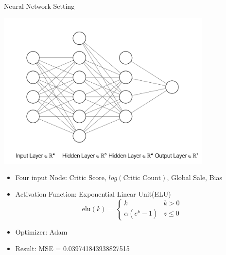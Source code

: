 \documentclass[ignorenonframetext,]{beamer}
\providecommand{\tightlist}{%
  \setlength{\itemsep}{0pt}\setlength{\parskip}{0pt}}
\begin{document}
\begin{frame}{Neural Network Setting}
\protect\hypertarget{neural-network-setting}{}

\includegraphics[width=\textwidth,height=3.125in]{nn.png}

\begin{itemize}
\tightlist
\item
  Four input Node: Critic Score, \(log(\text{Critic Count})\), Global
  Sale, Bias
\item
  Activation Function: Exponential Linear Unit(ELU)
  \[\text{elu}(k) = \begin{cases}k  & k>0\\\alpha(e^k-1) & z \leq 0\end{cases}\]
\item
  Optimizer: Adam
\item
  Result: MSE = 0.039741843938827515
\end{itemize}

\end{frame}
\end{document}
